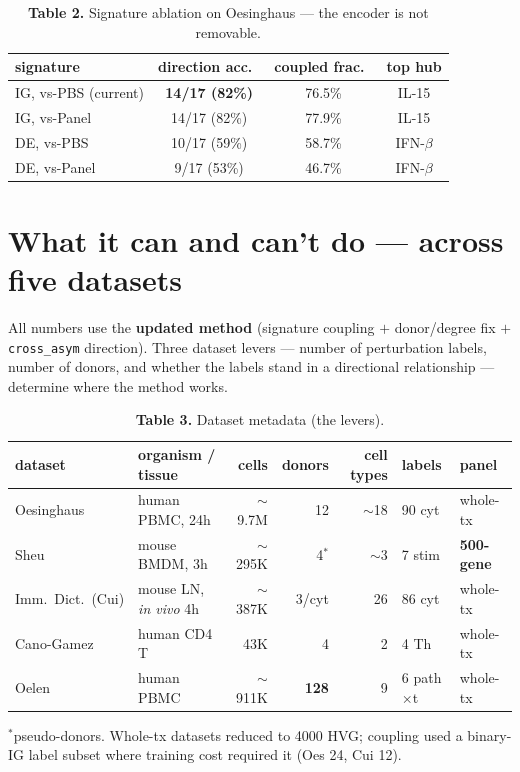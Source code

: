 \documentclass[11pt]{article}
\begin{document}
\begin{table}[h]\centering\small
\caption*{\textbf{Table 2.} Signature ablation on Oesinghaus --- the encoder is not removable.}
\begin{tabular}{lccc}
\toprule
signature & direction acc.\ & coupled frac.\ & top hub \\
\midrule
\rowcolor{hl}IG, vs-PBS (current) & \textbf{14/17 (82\%)} & 76.5\% & IL-15 \\
IG, vs-Panel & 14/17 (82\%) & 77.9\% & IL-15 \\
DE, vs-PBS & 10/17 (59\%) & 58.7\% & IFN-$\beta$ \\
DE, vs-Panel & 9/17 (53\%) & 46.7\% & IFN-$\beta$ \\
\bottomrule
\end{tabular}
\end{table}

\section{What it can and can't do --- across five datasets}
All numbers use the \textbf{updated method} (signature coupling $+$ donor/degree fix $+$
\texttt{cross\_asym} direction). Three dataset levers --- number of perturbation labels, number of
donors, and whether the labels stand in a directional relationship --- determine where the method
works.

\begin{table}[h]\centering\small
\caption*{\textbf{Table 3.} Dataset metadata (the levers).}
\begin{tabular}{llrrrll}
\toprule
dataset & organism / tissue & cells & donors & cell types & labels & panel \\
\midrule
Oesinghaus & human PBMC, 24h & $\sim$9.7M & 12 & $\sim$18 & 90 cyt & whole-tx \\
Sheu & mouse BMDM, 3h & $\sim$295K & 4$^\ast$ & $\sim$3 & 7 stim & \textbf{500-gene} \\
Imm.\ Dict.\ (Cui) & mouse LN, \emph{in vivo} 4h & $\sim$387K & 3/cyt & 26 & 86 cyt & whole-tx \\
Cano-Gamez & human CD4 T & 43K & 4 & 2 & 4 Th & whole-tx \\
Oelen & human PBMC & $\sim$911K & \textbf{128} & 9 & 6 path$\times$t & whole-tx \\
\bottomrule
\end{tabular}
\end{table}
\vspace{-0.7em}
{\footnotesize $^\ast$pseudo-donors. Whole-tx datasets reduced to 4000 HVG; coupling used a
binary-IG label subset where training cost required it (Oes 24, Cui 12).}
\end{document}
